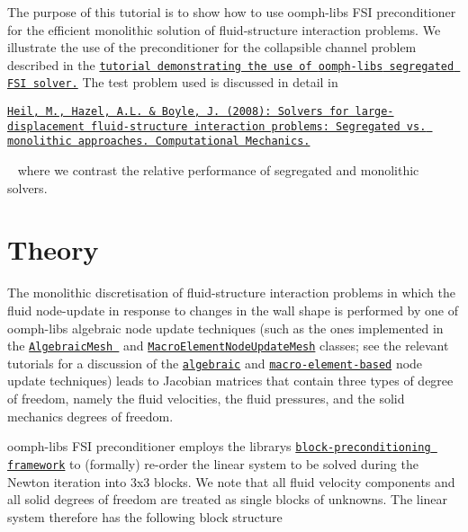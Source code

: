 The purpose of this tutorial is to show how to use {\ttfamily oomph-\/lib\textquotesingle{}s} F\+SI preconditioner for the efficient monolithic solution of fluid-\/structure interaction problems. We illustrate the use of the preconditioner for the collapsible channel problem described in the \href{../../../interaction/fsi_channel_segregated_solver/html/index.html}{\tt tutorial demonstrating the use of {\ttfamily oomph-\/lib\textquotesingle{}s} segregated F\+SI solver.} The test problem used is discussed in detail in \begin{center} \href{http://www.springerlink.com/content/m3r6318701g338g4/}{\tt Heil, M., Hazel, A.\+L. \& Boyle, J. (2008)\+: Solvers for large-\/displacement fluid-\/structure interaction problems\+: Segregated vs. monolithic approaches. Computational Mechanics.} \end{center}  ~\newline
where we contrast the relative performance of segregated and monolithic solvers.



 

\hypertarget{index_theory}{}\section{Theory}\label{index_theory}
The monolithic discretisation of fluid-\/structure interaction problems in which the fluid node-\/update in response to changes in the wall shape is performed by one of {\ttfamily oomph-\/lib\textquotesingle{}s} algebraic node update techniques (such as the ones implemented in the {\ttfamily  \href{../../../the_data_structure/html/classoomph_1_1AlgebraicMesh.html}{\tt Algebraic\+Mesh }} and {\ttfamily  \href{../../../the_data_structure/html/classoomph_1_1MacroElementNodeUpdateMesh.html}{\tt Macro\+Element\+Node\+Update\+Mesh}} classes; see the relevant tutorials for a discussion of the \href{../../../interaction/fsi_collapsible_channel_algebraic/html/index.html}{\tt algebraic} and \href{../../../interaction/macro_element_free_boundary_poisson/html/index.html}{\tt macro-\/element-\/based} node update techniques) leads to Jacobian matrices that contain three types of degree of freedom, namely the fluid velocities, the fluid pressures, and the solid mechanics degrees of freedom.

{\ttfamily oomph-\/lib\textquotesingle{}s} F\+SI preconditioner employs the library\textquotesingle{}s \href{../../../mpi/block_preconditioners/html/index.html}{\tt block-\/preconditioning framework} to (formally) re-\/order the linear system to be solved during the Newton iteration into 3x3 blocks. We note that all fluid velocity components and all solid degrees of freedom are treated as single blocks of unknowns. The linear system therefore has the following block structure

